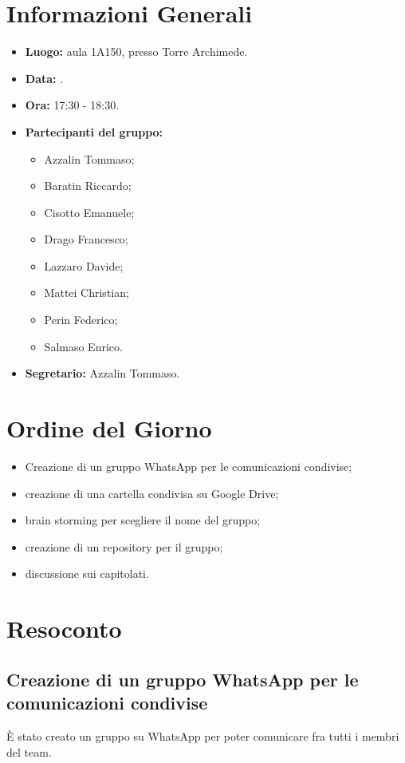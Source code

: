 \section{Informazioni Generali}
\begin{itemize}
\item \textbf{Luogo:} aula 1A150, presso Torre Archimede.
\item \textbf{Data:} \Data.
\item \textbf{Ora:} 17:30 - 18:30.
\item \textbf{Partecipanti del gruppo:}
	\begin{itemize}
		\item Azzalin Tommaso; 
		\item Baratin Riccardo;
		\item Cisotto Emanuele; 
		\item Drago Francesco;
		\item Lazzaro Davide;
		\item Mattei Christian;
		\item Perin Federico;
		\item Salmaso Enrico.
	\end{itemize} 
\item \textbf{Segretario:} Azzalin Tommaso.
\end{itemize}


\section{Ordine del Giorno}
\begin{itemize}
	\item Creazione di un gruppo WhatsApp per le comunicazioni condivise; 
	\item creazione di una cartella condivisa su Google Drive;
	\item brain storming per scegliere il nome del gruppo;
	\item creazione di un repository per il gruppo;
	\item discussione sui capitolati.
\end{itemize}

\section{Resoconto}
\subsection{Creazione di un gruppo WhatsApp per le comunicazioni condivise}
È stato creato un gruppo su WhatsApp per poter comunicare fra tutti i membri del team.

